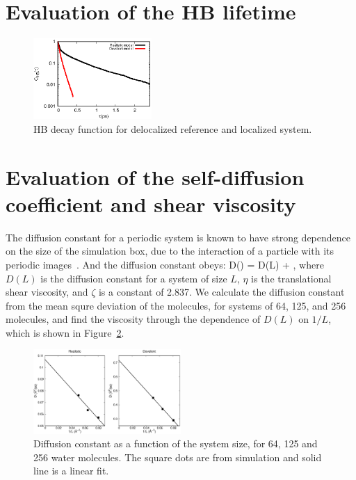 \documentclass[aps,prl,reprint,amsmath,amssymb]{revtex4-1}
\begin{document}
\section{Evaluation of the HB lifetime} 

\begin{figure}
\includegraphics[width=0.4\textwidth]{new_hbdecay}
\caption{HB decay function for delocalized reference and localized system.} \label{Fig:HBdecay}
\end{figure}

\section{Evaluation of the self-diffusion coefficient and shear viscosity} 

The diffusion constant for a periodic system is known to have strong dependence on the size of the simulation box, due to the interaction of a particle with its periodic images~\cite{dunweg1993molecular}. 
And the diffusion constant obeys:
%
\bea
D(\infty) = D(L) + ,
\eea
%
where $D(L)$ is the diffusion constant for a system of size $L$, $\eta$ is the translational shear viscosity, and $\zeta$ is a constant of 2.837. 
We calculate the diffusion constant from the mean squre deviation of the molecules, for systems of 64, 125, and 256 molecules, and find the viscosity through the dependence of $D(L)$ on $1/L$, which is shown in Figure~\ref{Fig:dfs}.

\begin{figure}
\includegraphics[width=0.5\textwidth]{msd}
\caption{Diffusion constant as a function of the system size, for 64, 125 and 256 water molecules. 
The square dots are from simulation and solid line is a linear fit.}\label{Fig:dfs}
\end{figure} 
\end{document}
